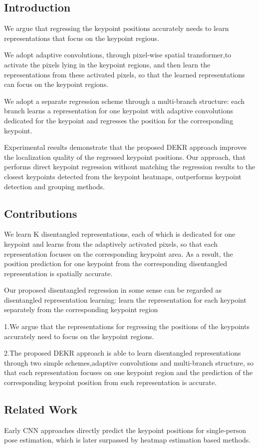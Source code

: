 \documentclass[11pt]{article}
\begin{document}
\subsection{Introduction}
We argue that regressing the keypoint positions accurately needs to learn representations that focus on the keypoint regious.

We adopt adaptive convolutions, through pixel-wise spatial transformer,to activate the pixels lying in the keypoint regions, and then learn the representations from these activated pixels, so that
the learned representations can focus on the keypoint regions.

We adopt a separate regression scheme through a multi-branch structure: each branch learns a representation for one keypoint with adaptive convolutions dedicated for the keypoint and regresses the position for the corresponding keypoint.

Experimental results demonstrate that the proposed DEKR approach improves the localization quality of the regressed keypoint positions. Our approach, that performs direct keypoint regression without matching the regression results to the closest keypoints detected from the keypoint heatmaps, outperforms keypoint detection and grouping  methods.
\subsection{Contributions}
We learn K disentangled representations, each of which is dedicated for one keypoint and learns from the adaptively activated pixels, so that each representation focuses on the corresponding keypoint area. As a result, the position prediction for one keypoint from the corresponding disentangled
representation is spatially accurate.

Our proposed disentangled regression in some sense can be regarded as disentangled representation learning: learn the representation for each keypoint separately from the corresponding keypoint region

1.We argue that the representations for regressing the positions of the keypoints accurately need to focus on the keypoint regions.

2.The proposed DEKR approach is able to learn disentangled representations through two simple schemes,adaptive convolutions and multi-branch structure, so that each representation focuses on one keypoint region and the prediction of the corresponding keypoint position from such representation is accurate.
\subsection{Related Work}
Early CNN approaches directly predict the keypoint positions for single-person pose estimation, which is later surpassed by heatmap estimation based methods.
\end{document}
